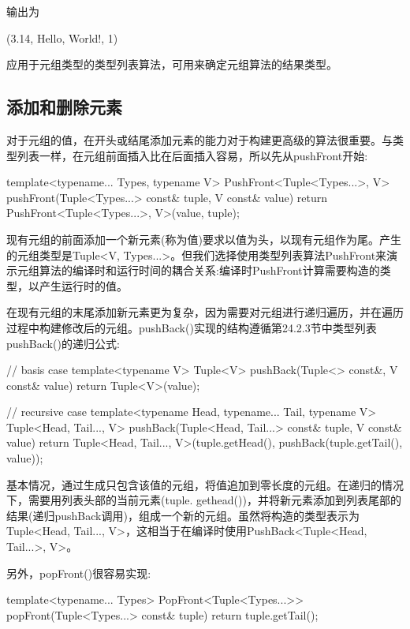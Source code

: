 输出为

\begin{shell}
(3.14, Hello, World!, 1)
\end{shell}

应用于元组类型的类型列表算法，可用来确定元组算法的结果类型。

\subsection{添加和删除元素}

对于元组的值，在开头或结尾添加元素的能力对于构建更高级的算法很重要。与类型列表一样，在元组前面插入比在后面插入容易，所以先从pushFront开始:

\begin{cpp}
template<typename... Types, typename V>
PushFront<Tuple<Types...>, V>
pushFront(Tuple<Types...> const& tuple, V const& value)
{
	return PushFront<Tuple<Types...>, V>(value, tuple);
}
\end{cpp}

现有元组的前面添加一个新元素(称为值)要求以值为头，以现有元组作为尾。产生的元组类型是Tuple<V, Types...>。但我们选择使用类型列表算法PushFront来演示元组算法的编译时和运行时间的耦合关系:编译时PushFront计算需要构造的类型，以产生运行时的值。

在现有元组的末尾添加新元素更为复杂，因为需要对元组进行递归遍历，并在遍历过程中构建修改后的元组。pushBack()实现的结构遵循第24.2.3节中类型列表pushBack()的递归公式:

\begin{cpp}
// basis case
template<typename V>
Tuple<V> pushBack(Tuple<> const&, V const& value)
{
	return Tuple<V>(value);
}

// recursive case
template<typename Head, typename... Tail, typename V>
Tuple<Head, Tail..., V>
pushBack(Tuple<Head, Tail...> const& tuple, V const& value)
{
	return Tuple<Head, Tail..., V>(tuple.getHead(),
	pushBack(tuple.getTail(), value));
}
\end{cpp}

基本情况，通过生成只包含该值的元组，将值追加到零长度的元组。在递归的情况下，需要用列表头部的当前元素(tuple. gethead())，并将新元素添加到列表尾部的结果(递归pushBack调用)，组成一个新的元组。虽然将构造的类型表示为Tuple<Head, Tail..., V>，这相当于在编译时使用PushBack<Tuple<Head, Tail...>, V>。

另外，popFront()很容易实现:

\begin{cpp}
template<typename... Types>
PopFront<Tuple<Types...>>
popFront(Tuple<Types...> const& tuple)
{
	return tuple.getTail();
}
\end{cpp}

